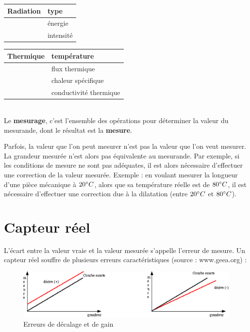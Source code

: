 \begin {center}
\begin{tabular}{|p{3cm}|p{7cm}|}
    Radiation & type      \\
    \hline
              & énergie   \\
    \hline
              & intensité \\
    \hline
\end{tabular}
\begin{tabular}{|p{3cm}|p{7cm}|}
    Thermique & température            \\
    \hline
              & flux thermique         \\
    \hline
              & chaleur spécifique     \\
    \hline
              & conductivité thermique \\
    \hline
\end{tabular}
\end{center}
~\\

Le \textbf{mesurage}, c'est l'ensemble des opérations pour déterminer la valeur du mesurande, dont le résultat est la \textbf{mesure}.

Parfois, la valeur que l'on peut mesurer n'est pas la valeur que l'on veut mesurer. La grandeur mesurée n'est alors pas équivalente au mesurande. Par exemple, si les conditions de mesure ne sont pas adéquates, il est alors nécessaire d'effectuer une correction de la valeur mesurée. Exemple : en voulant mesurer la longueur d'une pièce mécanique à $20 \degree C$, alors que sa température réelle est de $80 \degree C$, il est nécessaire d'effectuer une correction due à la dilatation (entre $20 \degree C$ et $80 \degree C$).

\section{Capteur réel}
L'écart entre la valeur vraie et la valeur mesurée s'appelle l'erreur de mesure. Un capteur réel souffre de plusieurs erreurs caractéristiques (source : www.geea.org) :

\begin{figure}[h!]
    \centering
    \includegraphics[width=\textwidth]{assets/figures/4_1_8_Erreurs_de_decalage_et_de_gain.PNG}
    \caption{Erreurs de décalage et de gain}
    \label{fig:Erreurs_de_decalage_et_de_gain}
\end{figure}


